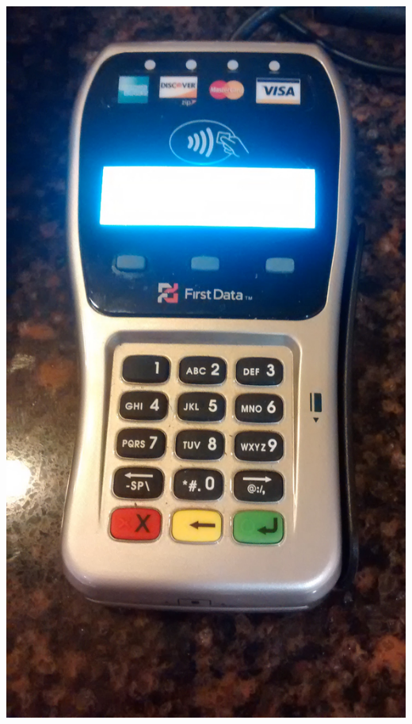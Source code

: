 \documentclass[unknownkeysallowed]{beamer}
\begin{document}
\begin{frame}
\begin{block}{}
\begin{center}
        \includegraphics[width=\linewidth,height=0.27\textheight,keepaspectratio]{figures/higbies.jpg}
      \end{center}
    \end{block}
\end{frame}
\end{document}

